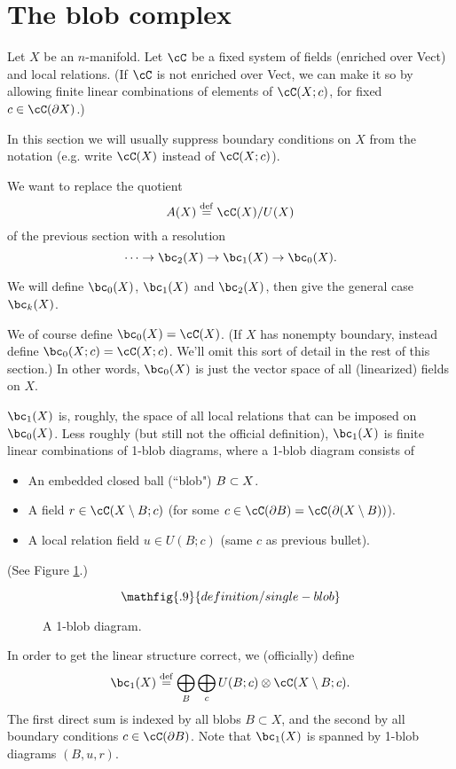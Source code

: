 
\section{The blob complex}
\label{sec:blob-definition}

Let $X$ be an $n$-manifold.
Let $\cC$ be a fixed system of fields (enriched over Vect) and local relations.
(If $\cC$ is not enriched over Vect, we can make it so by allowing finite
linear combinations of elements of $\cC(X; c)$, for fixed $c\in \cC(\bd X)$.)

In this section we will usually suppress boundary conditions on $X$ from the notation
(e.g. write $\lf(X)$ instead of $\lf(X; c)$).

We want to replace the quotient
\[
	A(X) \deq \lf(X) / U(X)
\]
of the previous section with a resolution
\[
	\cdots \to \bc_2(X) \to \bc_1(X) \to \bc_0(X) .
\]

We will define $\bc_0(X)$, $\bc_1(X)$ and $\bc_2(X)$, then give the general case $\bc_k(X)$.

We of course define $\bc_0(X) = \lf(X)$.
(If $X$ has nonempty boundary, instead define $\bc_0(X; c) = \lf(X; c)$.
We'll omit this sort of detail in the rest of this section.)
In other words, $\bc_0(X)$ is just the vector space of all (linearized) fields on $X$.

$\bc_1(X)$ is, roughly, the space of all local relations that can be imposed on $\bc_0(X)$.
Less roughly (but still not the official definition), $\bc_1(X)$ is finite linear
combinations of 1-blob diagrams, where a 1-blob diagram consists of
\begin{itemize}
\item An embedded closed ball (``blob") $B \subset X$.
\item A field $r \in \cC(X \setmin B; c)$
(for some $c \in \cC(\bd B) = \cC(\bd(X \setmin B))$).
\item A local relation field $u \in U(B; c)$
(same $c$ as previous bullet).
\end{itemize}
(See Figure \ref{blob1diagram}.)
\begin{figure}[t]\begin{equation*}
\mathfig{.9}{definition/single-blob}
\end{equation*}\caption{A 1-blob diagram.}\label{blob1diagram}\end{figure}
In order to get the linear structure correct, we (officially) define
\[
	\bc_1(X) \deq \bigoplus_B \bigoplus_c U(B; c) \otimes \lf(X \setmin B; c) .
\]
The first direct sum is indexed by all blobs $B\subset X$, and the second
by all boundary conditions $c \in \cC(\bd B)$.
Note that $\bc_1(X)$ is spanned by 1-blob diagrams $(B, u, r)$.

